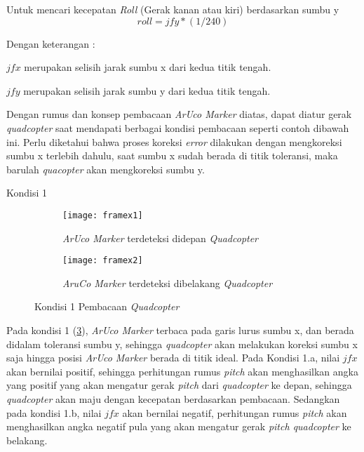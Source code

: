 Untuk mencari kecepatan \textit{Roll} (Gerak kanan atau kiri) berdasarkan sumbu y
\begin{equation}
	roll = jfy*(1/240)
\end{equation}

Dengan keterangan :

\begin{packed_item}
	\item \({jfx}\) merupakan selisih jarak sumbu x dari kedua titik tengah.
	\item \({jfy}\) merupakan selisih jarak sumbu y dari kedua titik tengah. \\
\end{packed_item}

Dengan rumus dan konsep pembacaan \textit{ArUco Marker} diatas, dapat diatur gerak \textit{quadcopter} saat mendapati berbagai kondisi pembacaan seperti contoh dibawah ini. Perlu diketahui bahwa proses koreksi \textit{error} dilakukan dengan mengkoreksi sumbu x terlebih dahulu, saat sumbu x sudah berada di titik toleransi, maka barulah \textit{quacopter} akan mengkoreksi sumbu y.

Kondisi 1

\begin{figure}[H]
	\centering
	\begin{subfigure}[b]{0.4\textwidth}
		\centering
		\texttt{[image: framex1]}
		\caption{\textit{ArUco Marker} terdeteksi didepan \textit{Quadcopter}}
		\label{fig:framex1}
	\end{subfigure}
	\hfill
	\begin{subfigure}[b]{0.4\textwidth}
		\centering
		\texttt{[image: framex2]}
		\caption{\textit{AruCo Marker} terdeteksi dibelakang \textit{Quadcopter}}
		\label{fig:framex2}
	\end{subfigure}
	\caption{Kondisi 1 Pembacaan \textit{Quadcopter}}
	\label{fig:kondisi1}
\end{figure}

Pada kondisi 1 (\cref{fig:kondisi1}), \textit{ArUco Marker} terbaca pada garis lurus sumbu x, dan berada didalam toleransi sumbu y, sehingga \textit{quadcopter} akan melakukan koreksi sumbu x saja hingga posisi \textit{ArUco Marker} berada di titik ideal. 
Pada Kondisi 1.a, nilai \({jfx}\) akan bernilai positif, sehingga perhitungan rumus \textit{pitch} akan menghasilkan angka yang positif yang akan mengatur gerak \textit{pitch} dari \textit{quadcopter} ke depan, sehingga \textit{quadcopter} akan maju dengan kecepatan berdasarkan pembacaan. 
Sedangkan pada kondisi 1.b, nilai \({jfx}\) akan bernilai negatif, perhitungan rumus \textit{pitch} akan menghasilkan angka negatif pula yang akan mengatur gerak \textit{pitch quadcopter} ke belakang. \\

